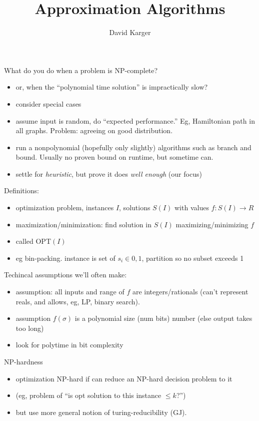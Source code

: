 \documentclass{article}
\title{Approximation Algorithms}
\author{David Karger}
\begin{document}
What do you do when a problem is NP-complete?
\begin{itemize}
\item or, when the ``polynomial time solution'' is impractically slow?
\item consider special cases
\item assume input is random, do ``expected performance.''  Eg,
  Hamiltonian path in all graphs.  Problem: agreeing on good
  distribution.  
\item run a nonpolynomial (hopefully only slightly) algorithms such as
  branch and bound.  Usually no proven bound on runtime, but sometime can.
\item settle for \emph{heuristic}, but prove it does \emph{well enough}
  (our focus) 
\end{itemize}

Definitions:
\begin{itemize}
\item optimization problem, instances $I$, solutions $S(I)$ with
  values $f:S(I) \rightarrow R$
\item maximization/minimization: find solution in $S(I)$
  maximizing/minimizing $f$ 
\item called OPT$(I)$
\item eg bin-packing.  instance is set of $s_i \in {0,1}$, partition
  so no subset exceeds 1
\end{itemize}

Techincal assumptions we'll often make:
\begin{itemize}
\item assumption: all inputs and range of $f$ are integers/rationals
  (can't represent reals, and allows, eg, LP, binary search).  
\item assumption $f(\sigma)$ is a polynomial size (num bits) number
  (else output takes too long)
\item look for polytime in bit complexity
\end{itemize}

NP-hardness
\begin{itemize}
\item optimization NP-hard if can reduce  an NP-hard decision problem to it
\item (eg, problem of ``is opt solution to this instance $\le k$?'')
\item but use more general notion of turing-reducibility (GJ).
\end{itemize}
\end{document}
